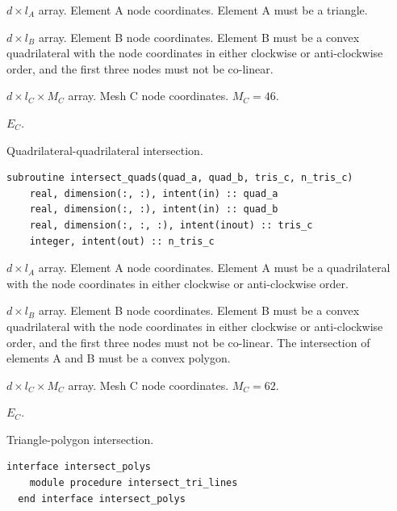 \documentclass{article}
\begin{document}
\begin{description}[font=\ttfamily\bfseries,leftmargin=2.2\parindent,labelindent=1.7\parindent,noitemsep]
  \item[tri\_a] $d \times l_A$ array. Element A node coordinates. Element A
    must be a triangle.
  \item[quad\_b] $d \times l_B$ array. Element B node coordinates. Element B
    must be a convex quadrilateral with the node coordinates in either clockwise
    or anti-clockwise order, and the first three nodes must not be co-linear.
  \item[tris\_c] $d \times l_C \times M_C$ array. Mesh C node coordinates.
    $M_C = 46$.
  \item[n\_tris\_c] $E_C$.
\end{description}

\noindent Quadrilateral-quadrilateral intersection.

\begin{lstlisting}[language=FORTRAN]
  subroutine intersect_quads(quad_a, quad_b, tris_c, n_tris_c)
    real, dimension(:, :), intent(in) :: quad_a
    real, dimension(:, :), intent(in) :: quad_b
    real, dimension(:, :, :), intent(inout) :: tris_c
    integer, intent(out) :: n_tris_c
\end{lstlisting}

\begin{description}[font=\ttfamily\bfseries,leftmargin=2.2\parindent,labelindent=1.7\parindent,noitemsep]
  \item[quad\_a] $d \times l_A$ array. Element A node coordinates. Element A
    must be a quadrilateral with the node coordinates in either clockwise or
    anti-clockwise order.
  \item[quad\_b] $d \times l_B$ array. Element B node coordinates. Element B
    must be a convex quadrilateral with the node coordinates in either clockwise
    or anti-clockwise order, and the first three nodes must not be co-linear.
    The intersection of elements A and B must be a convex polygon.
  \item[tris\_c] $d \times l_C \times M_C$ array. Mesh C node coordinates.
    $M_C = 62$.
  \item[n\_tris\_c] $E_C$.
\end{description}

\noindent Triangle-polygon intersection.
  
\begin{lstlisting}[language=FORTRAN]
  interface intersect_polys
    module procedure intersect_tri_lines
  end interface intersect_polys
\end{lstlisting}
\end{document}

